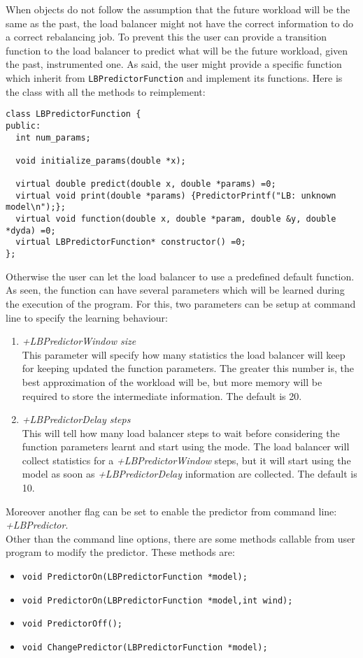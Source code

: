When objects do not follow the assumption that the future workload will be the
same as the past, the load balancer might not have the correct information to do
a correct rebalancing job. To prevent this the user can provide a transition
function to the load balancer to predict what will be the future workload, given
the past, instrumented one. As said, the user might provide a specific function
which inherit from {\tt LBPredictorFunction} and implement its
functions. Here is the class with all the methods to reimplement:
\begin{verbatim}
class LBPredictorFunction {
public:
  int num_params;
 
  void initialize_params(double *x);

  virtual double predict(double x, double *params) =0;
  virtual void print(double *params) {PredictorPrintf("LB: unknown model\n");};
  virtual void function(double x, double *param, double &y, double *dyda) =0;
  virtual LBPredictorFunction* constructor() =0;
};
\end{verbatim}
Otherwise the user can let the load balancer to use a predefined default
function.
As seen, the function can have several parameters which will be learned during
the execution of the program. For this, two parameters can be setup at command
line to specify the learning behaviour:
\begin{enumerate}
\item {\em +LBPredictorWindow size}\\
This parameter will specify how many statistics the load balancer will keep for
keeping updated the function parameters. The greater this number is, the best
approximation of the workload will be, but more memory will be required to store
the intermediate information. The default is 20.
\item {\em +LBPredictorDelay steps}\\
This will tell how many load balancer steps to wait before considering the
function parameters learnt and start using the mode. The load balancer will
collect statistics for a {\em +LBPredictorWindow} steps, but it will start using
the model as soon as {\em +LBPredictorDelay} information are collected. The
default is 10.
\end{enumerate}
Moreover another flag can be set to enable the predictor from command line: {\em
+LBPredictor}.\\
Other than the command line options, there are some methods
callable from user program to modify the predictor. These methods are:
\begin{itemize}
\item {\tt void PredictorOn(LBPredictorFunction *model);}
\item {\tt void PredictorOn(LBPredictorFunction *model,int wind);}
\item {\tt void PredictorOff();}
\item {\tt void ChangePredictor(LBPredictorFunction *model);}
\end{itemize}


